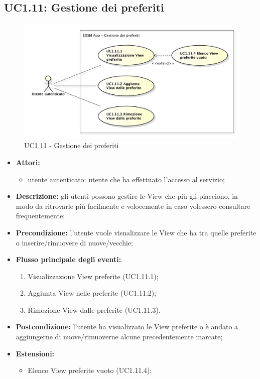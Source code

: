 \pagebreak


\subsection{UC1.11: Gestione dei preferiti}
\begin{figure}[htbp]
	\centering
	\centerline{\includegraphics[scale=0.50]{./images/UC1_11.pdf}}
	\caption{UC1.11 - Gestione dei preferiti}
\end{figure}

\begin{itemize}
	\item \textbf{Attori:}
	\begin{itemize}
		\item utente autenticato: utente che ha effettuato l'accesso al servizio;
	\end{itemize}
	\item \textbf{Descrizione:} gli utenti possono gestire le View che più gli piacciono, in modo da ritrovarle più facilmente e velocemente in caso volessero consultare frequentemente;
	\item \textbf{Precondizione:} l'utente vuole visualizzare le View che ha tra quelle preferite o inserire/rimuovere di nuove/vecchie;
	\item \textbf{Flusso principale degli eventi:}
	\begin{enumerate}
		\item Visualizzazione View preferite (UC1.11.1);
		\item Aggiunta View nelle preferite (UC1.11.2);
		\item Rimozione View dalle preferite (UC1.11.3).
	\end{enumerate}
	\item \textbf{Postcondizione:} l'utente ha visualizzato le View preferite o è andato a aggiungerne di nuove/rimuoverne alcune precedentemente marcate;
	\item \textbf{Estensioni:}
	\begin{itemize}
		\item Elenco View preferite vuoto (UC1.11.4);
	\end{itemize}
\end{itemize}

